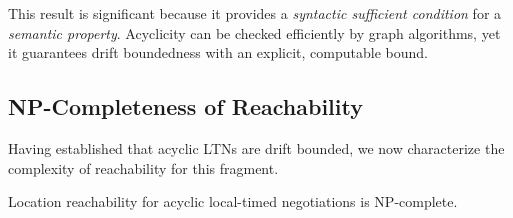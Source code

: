 This result is significant because it provides a \emph{syntactic sufficient condition} for a \emph{semantic property}. Acyclicity can be checked efficiently by graph algorithms, yet it guarantees drift boundedness with an explicit, computable bound.

\subsection{NP-Completeness of Reachability}

Having established that acyclic LTNs are drift bounded, we now characterize the complexity of reachability for this fragment.

\begin{theorem}
\label{thm:acyclic-np}
Location reachability for acyclic local-timed negotiations is NP-complete.
\end{theorem}

